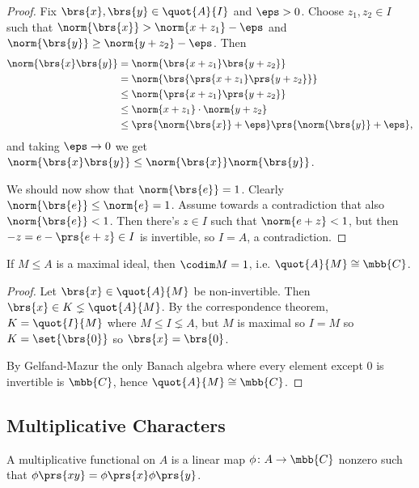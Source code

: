\documentclass[10pt, twoside]{book}
\begin{document}
\begin{proof}
Fix $\brs{x}, \brs{y} \in \quot{A}{I}$ and $\eps > 0$. Choose $z_1, z_2 \in I$ such that
$\norm{\brs{x}} > \norm{x + z_1} - \eps$ and $\norm{\brs{y}} \geq \norm{y + z_2} - \eps$.
Then
\begin{align*}
\norm{\brs{x} \brs{y}} &= \norm{\brs{x + z_1} \brs{y + z_2}}
\\&= \norm{\brs{\prs{x + z_1} \prs{y + z_2}}}
\\&\leq \norm{\prs{x + z_1} \prs{y + z_2}}
\\&\leq \norm{x + z_1} \cdot \norm{y + z_2}
\\&\leq \prs{\norm{\brs{x}} + \eps} \prs{\norm{\brs{y}} + \eps} \text{,}
\end{align*}
and taking $\eps \to 0$ we get $\norm{\brs{x} \brs{y}} \leq \norm{\brs{x}} \norm{\brs{y}}$.

We should now show that $\norm{\brs{e}} = 1$. Clearly $\norm{\brs{e}} \leq \norm{e} = 1$. Assume towards a contradiction that also $\norm{\brs{e}} < 1$. Then there's $z \in I$ such that $\norm{e + z} < 1$, but then
$-z = e - \prs{e + z} \in I$
is invertible, so $I = A$, a contradiction.
\end{proof}

\begin{proposition}
If $M \leq A$ is a maximal ideal, then $\codim M = 1$, i.e. $\quot{A}{M} \cong \mbb{C}$.
\end{proposition}

\begin{proof}
Let $\brs{x} \in \quot{A}{M}$ be non-invertible. Then $\brs{x} \in K \lneq \quot{A}{M}$. By the correspondence theorem, $K = \quot{I}{M}$ where $M \leq I \lneq A$, but $M$ is maximal so $I = M$ so $K = \set{\brs{0}}$ so $\brs{x} = \brs{0}$.

By Gelfand-Mazur the only Banach algebra where every element except $0$ is invertible is $\mbb{C}$, hence $\quot{A}{M} \cong \mbb{C}$.
\end{proof}

\subsection{Multiplicative Characters}

\begin{definition}
A multiplicative functional on $A$ is a linear map $\phi \colon A \to \mbb{C}$ nonzero such that $\phi\prs{xy} = \phi\prs{x} \phi\prs{y}$.
\end{definition}
\end{document}
